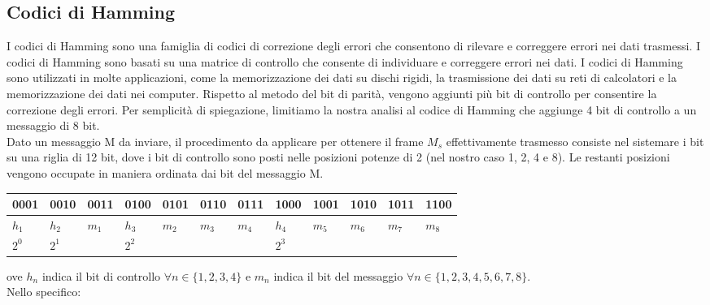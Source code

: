 \documentclass[12pt]{report}
\begin{document}
	\subsection{Codici di Hamming}
	I codici di Hamming sono una famiglia di codici di correzione degli errori che consentono di rilevare e correggere errori nei dati trasmessi. I codici di Hamming sono basati su una matrice di controllo che consente di individuare e correggere errori nei dati. I codici di Hamming sono utilizzati in molte applicazioni, come la memorizzazione dei dati su dischi rigidi, la trasmissione dei dati su reti di calcolatori e la memorizzazione dei dati nei computer. Rispetto al metodo del bit di parità, vengono aggiunti più bit di controllo per consentire la correzione degli errori. Per semplicità di spiegazione, limitiamo la nostra analisi al codice di Hamming che aggiunge 4 bit di controllo a un messaggio di 8 bit.
	\vspace{\baselineskip}\\
	Dato un messaggio M da inviare, il procedimento da applicare per ottenere il frame $M_s$ effettivamente trasmesso consiste nel sistemare i bit su una riglia di 12 bit, dove i bit di controllo sono posti nelle posizioni potenze di 2 (nel nostro caso 1, 2, 4 e 8). Le restanti posizioni vengono occupate in maniera ordinata dai bit del messaggio M.
	\begin{center}
		\begin{tabular}{|l|l|l|l|l|l|l|l|l|l|l|l|}
		\hline
		0001                 & 0010                 & 0011 & 0100                & 0101 & 0110 & 0111 & 1000                 & 1001 & 1010 & 1011 & 1100 \\ \hline
		$h_1$                   & $h_2$                   & $m_1$   & $h_3$                  & $m_2$   & $m_3$   & $m_4$   & $h_4$                   & $m_5$   & $m_6$   & $m_7$   & $m_8$   \\ \hline
		$2^0$ & $2^1$ &      & $2^2$ &      &      &      & $2^3$ &      &      &      &      \\ \hline
		\end{tabular}
	\end{center}
	ove $h_n$ indica il bit di controllo $\forall n \in \{1, 2, 3, 4\}$ e $m_n$ indica il bit del messaggio $\forall n \in \{1, 2, 3, 4, 5, 6, 7, 8\}$.
	\vspace{\baselineskip}\\
	Nello specifico:
\end{document}
